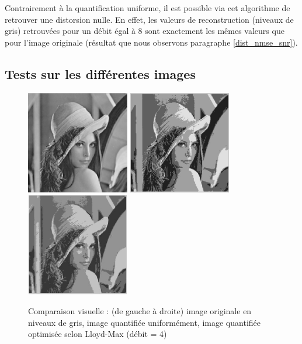 \documentclass[a4paper, 12pt]{article}
\begin{document}
Contrairement à la quantification uniforme, il est possible via cet algorithme de retrouver une distorsion nulle. En effet, les valeurs de reconstruction (niveaux de gris) retrouvées pour un débit égal à 8 sont exactement les mêmes valeurs que pour l'image originale (résultat que nous observons paragraphe \ref{dist_nmse_snr}).

\subsection{Tests sur les différentes images}


\begin{figure}[H]
	\centering
		\includegraphics[width=4.5cm, height=4.5cm]{../lena_grey.jpg}
		\includegraphics[width=4.5cm, height=4.5cm]{../lena_quant_4_niveaux.jpg}
		\includegraphics[width=4.5cm, height=4.5cm]{../lena_quantlloyd_4_niveaux.jpg}
	\caption{Comparaison visuelle : (de gauche à droite) image originale en niveaux de gris, image quantifiée uniformément, image quantifiée optimisée selon Lloyd-Max (débit = 4)}
	\label{fig:comparaison_img_quant}
\end{figure}
\end{document}
